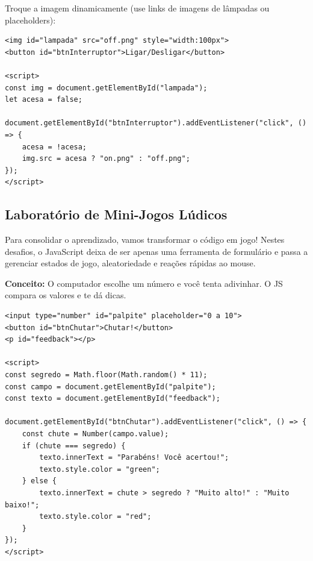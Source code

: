 \documentclass[12pt,a4paper]{article}
\begin{document}
\begin{boxAtividade}
Troque a imagem dinamicamente (use links de imagens de lâmpadas ou placeholders):

\begin{boxCodigo}
\begin{verbatim}
<img id="lampada" src="off.png" style="width:100px">
<button id="btnInterruptor">Ligar/Desligar</button>

<script>
const img = document.getElementById("lampada");
let acesa = false;

document.getElementById("btnInterruptor").addEventListener("click", () => {
    acesa = !acesa;
    img.src = acesa ? "on.png" : "off.png";
});
</script>
\end{verbatim}
\end{boxCodigo}
\end{boxAtividade}

\subsection{Laboratório de Mini-Jogos Lúdicos}

\begin{boxAtividade}
Para consolidar o aprendizado, vamos transformar o código em jogo! Nestes desafios, o JavaScript deixa de ser apenas uma ferramenta de formulário e passa a gerenciar estados de jogo, aleatoriedade e reações rápidas ao mouse.
\end{boxAtividade}

\begin{boxAtividade}
\textbf{Conceito:} O computador escolhe um número e você tenta adivinhar. O JS compara os valores e te dá dicas.

\begin{boxCodigo}
\begin{verbatim}
<input type="number" id="palpite" placeholder="0 a 10">
<button id="btnChutar">Chutar!</button>
<p id="feedback"></p>

<script>
const segredo = Math.floor(Math.random() * 11);
const campo = document.getElementById("palpite");
const texto = document.getElementById("feedback");

document.getElementById("btnChutar").addEventListener("click", () => {
    const chute = Number(campo.value);
    if (chute === segredo) {
        texto.innerText = "Parabéns! Você acertou!";
        texto.style.color = "green";
    } else {
        texto.innerText = chute > segredo ? "Muito alto!" : "Muito baixo!";
        texto.style.color = "red";
    }
});
</script>
\end{verbatim}
\end{boxCodigo}
\end{boxAtividade}
\end{document}
